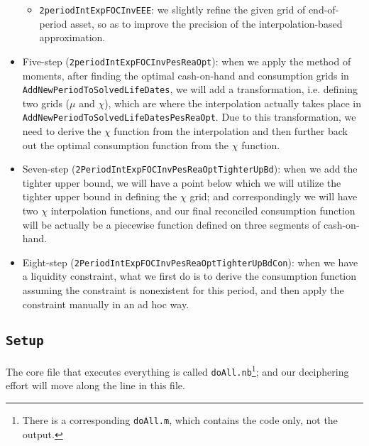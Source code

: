 \documentclass[titlepage,abstract]{\econtex}
\begin{document}
\begin{itemize}
\begin{itemize}
    \item \texttt{2periodIntExpFOCInvEEE}: we slightly refine the given grid of end-of-period asset, so as to improve the precision of the interpolation-based approximation.
    \end{itemize}
\item Five-step (\texttt{2periodIntExpFOCInvPesReaOpt}): when we apply the method of moments, after finding the optimal cash-on-hand and consumption grids in \texttt{AddNewPeriodToSolvedLifeDates}, we will add a transformation, i.e. defining two grids ($\mu$ and $\chi$), which are where the interpolation actually takes place in \texttt{AddNewPeriodToSolvedLifeDatesPesReaOpt}. Due to this transformation, we need to derive the $\chi$ function from the interpolation and then further back out the optimal consumption function from the $\chi$ function.

\item Seven-step (\texttt{2PeriodIntExpFOCInvPesReaOptTighterUpBd}): when we add the tighter upper bound, we will have a point below which we will utilize the tighter upper bound in defining the $\chi$ grid; and correspondingly we will have two $\chi$ interpolation functions, and our final reconciled consumption function will be actually be a piecewise function defined on three segments of cash-on-hand.

\item Eight-step (\texttt{2PeriodIntExpFOCInvPesReaOptTighterUpBdCon}): when we have a liquidity constraint, what we first do is to derive the consumption function assuming the constraint is nonexistent for this period, and then apply the constraint manually in an ad hoc way.
\end{itemize}

\subsection{\texttt{Setup}}
The core file that executes everything is called \texttt{doAll.nb}\footnote{There is a corresponding \texttt{doAll.m}, which contains the code only, not the output.}; and our deciphering effort will move along the line in this file.
\end{document}
